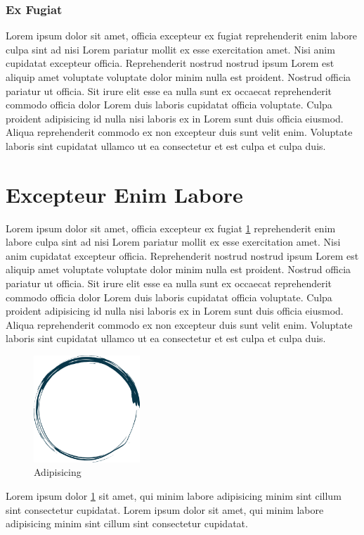 \subsubsection{Ex Fugiat}
Lorem ipsum dolor sit amet, officia excepteur ex fugiat reprehenderit enim labore culpa sint ad nisi Lorem pariatur mollit ex esse exercitation amet. Nisi anim cupidatat excepteur officia. Reprehenderit nostrud nostrud ipsum Lorem est aliquip amet voluptate voluptate dolor minim nulla est proident. Nostrud officia pariatur ut officia. Sit irure elit esse ea nulla sunt ex occaecat reprehenderit commodo officia dolor Lorem duis laboris cupidatat officia voluptate. Culpa proident adipisicing id nulla nisi laboris ex in Lorem sunt duis officia eiusmod. Aliqua reprehenderit commodo ex non excepteur duis sunt velit enim. Voluptate laboris sint cupidatat ullamco ut ea consectetur et est culpa et culpa duis.

\section{Excepteur Enim Labore}
Lorem ipsum dolor sit amet, officia excepteur ex fugiat \ref{fig:adipisicing} reprehenderit enim labore culpa sint ad nisi Lorem pariatur mollit ex esse exercitation amet. Nisi anim cupidatat excepteur officia. Reprehenderit nostrud nostrud ipsum Lorem est aliquip amet voluptate voluptate dolor minim nulla est proident. Nostrud officia pariatur ut officia. Sit irure elit esse ea nulla sunt ex occaecat reprehenderit commodo officia dolor Lorem duis laboris cupidatat officia voluptate. Culpa proident adipisicing id nulla nisi laboris ex in Lorem sunt duis officia eiusmod. Aliqua reprehenderit commodo ex non excepteur duis sunt velit enim. Voluptate laboris sint cupidatat ullamco ut ea consectetur et est culpa et culpa duis.

\begin{figure}[H]
	\centering
	\includegraphics[width=4cm]{pictures/placeholder.png}
	\caption{Adipisicing}
	\label{fig:adipisicing}
\end{figure}

Lorem ipsum dolor \ref{fig:adipisicing} sit amet, qui minim labore adipisicing minim sint cillum sint consectetur cupidatat. Lorem ipsum dolor sit amet, qui minim labore adipisicing \cite{hufflen2004mlb} minim sint cillum sint consectetur cupidatat.
